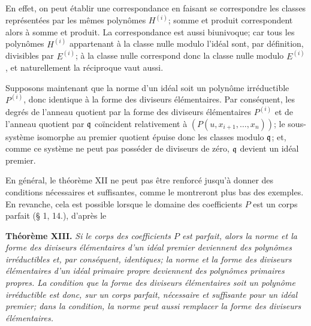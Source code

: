 En effet, on peut établir une correspondance en faisant se correspondre les classes représentées par les mêmes polynômes $H^{(i)}$; somme et produit correspondent alors à somme et produit. La correspondance est aussi biunivoque; car tous les polynômes $H^{(i)}$ appartenant à la classe nulle modulo l'idéal sont, par définition, divisibles par $E^{(i)}$; à la classe nulle correspond donc la classe nulle modulo $E^{(i)}$, et naturellement la réciproque vaut aussi.

Supposons maintenant que la norme d'un idéal soit un polynôme irréductible $P^{(i)}$, donc identique à la forme des diviseurs élémentaires. Par conséquent, les degrés de l'anneau quotient par la forme des diviseurs élémentaires $P^{(i)}$ et de l'anneau quotient par $\mathfrak q$ coïncident relativement à $(P(u,x_{i+1},\ldots,x_n))$; le sous-système isomorphe au premier quotient épuise donc les classes modulo $\mathfrak q$; et, comme ce système ne peut pas posséder de diviseurs de zéro, $\mathfrak q$ devient un idéal premier.

En général, le théorème XII ne peut pas être renforcé jusqu'à donner des conditions nécessaires et suffisantes, comme le montreront plus bas des exemples. En revanche, cela est possible lorsque le domaine des coefficients $P$ est un corps parfait (\S{} 1, 14.), d'après le

\textbf{Théorème XIII.} \emph{Si le corps des coefficients $P$ est parfait, alors la norme et la forme des diviseurs élémentaires d'un idéal premier deviennent des polynômes irréductibles et, par conséquent, identiques; la norme et la forme des diviseurs élémentaires d'un idéal primaire propre deviennent des polynômes primaires propres. La condition que la forme des diviseurs élémentaires soit un polynôme irréductible est donc, sur un corps parfait, nécessaire et suffisante pour un idéal premier; dans la condition, la norme peut aussi remplacer la forme des diviseurs élémentaires.}

